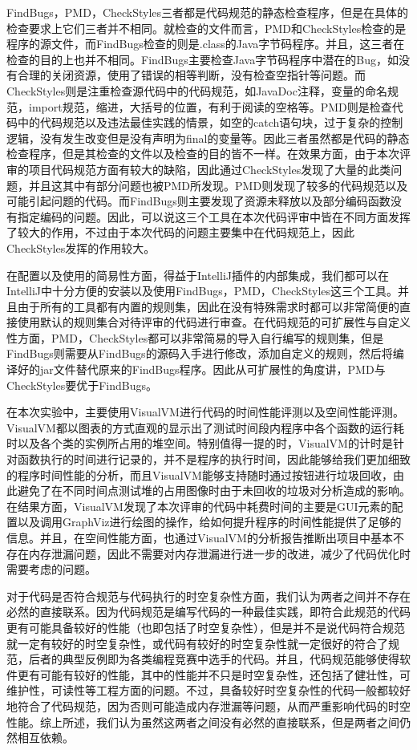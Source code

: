 FindBugs，PMD，CheckStyles三者都是代码规范的静态检查程序，但是在具体的检查要求上它们三者并不相同。就检查的文件而言，PMD和CheckStyles检查的是程序的源文件，而FindBugs检查的则是.class的Java字节码程序。并且，这三者在检查的目的上也并不相同。FindBugs主要检查Java字节码程序中潜在的Bug，如没有合理的关闭资源，使用了错误的相等判断，没有检查空指针等问题。而CheckStyles则是注重检查源代码中的代码规范，如JavaDoc注释，变量的命名规范，import规范，缩进，大括号的位置，有利于阅读的空格等。PMD则是检查代码中的代码规范以及违法最佳实践的情景，如空的catch语句块，过于复杂的控制逻辑，没有发生改变但是没有声明为final的变量等。因此三者虽然都是代码的静态检查程序，但是其检查的文件以及检查的目的皆不一样。在效果方面，由于本次评审的项目代码规范方面有较大的缺陷，因此通过CheckStyles发现了大量的此类问题，并且这其中有部分问题也被PMD所发现。PMD则发现了较多的代码规范以及可能引起问题的代码。而FindBugs则主要发现了资源未释放以及部分编码函数没有指定编码的问题。因此，可以说这三个工具在本次代码评审中皆在不同方面发挥了较大的作用，不过由于本次代码的问题主要集中在代码规范上，因此CheckStyles发挥的作用较大。

在配置以及使用的简易性方面，得益于IntelliJ插件的内部集成，我们都可以在IntelliJ中十分方便的安装以及使用FindBugs，PMD，CheckStyles这三个工具。并且由于所有的工具都有内置的规则集，因此在没有特殊需求时都可以非常简便的直接使用默认的规则集合对待评审的代码进行审查。在代码规范的可扩展性与自定义性方面，PMD，CheckStyles都可以非常简易的导入自行编写的规则集，但是FindBugs则需要从FindBugs的源码入手进行修改，添加自定义的规则，然后将编译好的jar文件替代原来的FindBugs程序。因此从可扩展性的角度讲，PMD与CheckStyles要优于FindBugs。

在本次实验中，主要使用VisualVM进行代码的时间性能评测以及空间性能评测。VisualVM都以图表的方式直观的显示出了测试时间段内程序中各个函数的运行耗时以及各个类的实例所占用的堆空间。特别值得一提的时，VisualVM的计时是针对函数执行的时间进行记录的，并不是程序的执行时间，因此能够给我们更加细致的程序时间性能的分析，而且VisualVM能够支持随时通过按钮进行垃圾回收，由此避免了在不同时间点测试堆的占用图像时由于未回收的垃圾对分析造成的影响。在结果方面，VisualVM发现了本次评审的代码中耗费时间的主要是GUI元素的配置以及调用GraphViz进行绘图的操作，给如何提升程序的时间性能提供了足够的信息。并且，在空间性能方面，也通过VisualVM的分析报告推断出项目中基本不存在内存泄漏问题，因此不需要对内存泄漏进行进一步的改进，减少了代码优化时需要考虑的问题。

对于代码是否符合规范与代码执行的时空复杂性方面，我们认为两者之间并不存在必然的直接联系。因为代码规范是编写代码的一种最佳实践，即符合此规范的代码更有可能具备较好的性能（也即包括了时空复杂性），但是并不是说代码符合规范就一定有较好的时空复杂性，或代码有较好的时空复杂性就一定很好的符合了规范，后者的典型反例即为各类编程竞赛中选手的代码。并且，代码规范能够使得软件更有可能有较好的性能，其中的性能并不只是时空复杂性，还包括了健壮性，可维护性，可读性等工程方面的问题。不过，具备较好时空复杂性的代码一般都较好地符合了代码规范，因为否则可能造成内存泄漏等问题，从而严重影响代码的时空性能。综上所述，我们认为虽然这两者之间没有必然的直接联系，但是两者之间仍然相互依赖。

